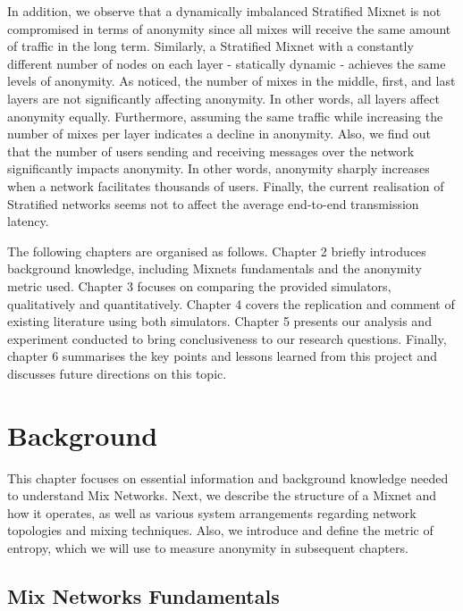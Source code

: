 \documentclass[logo,msc,cyber]{infthesis}   %
\begin{document}
In addition, we observe that a dynamically imbalanced Stratified Mixnet is not
compromised in terms of anonymity since all mixes will receive the same amount
of traffic in the long term. Similarly, a Stratified Mixnet with a constantly
different number of nodes on each layer - statically dynamic - achieves the same
levels of anonymity. As noticed, the number of mixes in the middle, first, and
last layers are not significantly affecting anonymity. In other words, all
layers affect anonymity equally. Furthermore, assuming the same traffic while
increasing the number of mixes per layer indicates a decline in anonymity. Also,
we find out that the number of users sending and receiving messages over the
network significantly impacts anonymity. In other words, anonymity sharply
increases when a network facilitates thousands of users. Finally, the current
realisation of Stratified networks seems not to affect the average end-to-end
transmission latency.

The following chapters are organised as follows. Chapter 2 briefly introduces
background knowledge, including Mixnets fundamentals and the anonymity metric
used. Chapter 3 focuses on comparing the provided simulators, qualitatively and
quantitatively. Chapter 4 covers the replication and comment of existing
literature using both simulators. Chapter 5 presents our analysis and experiment
conducted to bring conclusiveness to our research questions. Finally, chapter 6
summarises the key points and lessons learned from this project and discusses
future directions on this topic.


\chapter{Background}
This chapter focuses on essential information and background knowledge needed to
understand Mix Networks. Next, we describe the structure of a Mixnet and how it
operates, as well as various system arrangements regarding network topologies
and mixing techniques. Also, we introduce and define the metric of entropy,
which we will use to measure anonymity in subsequent chapters.

\section{Mix Networks Fundamentals} 
\end{document}
